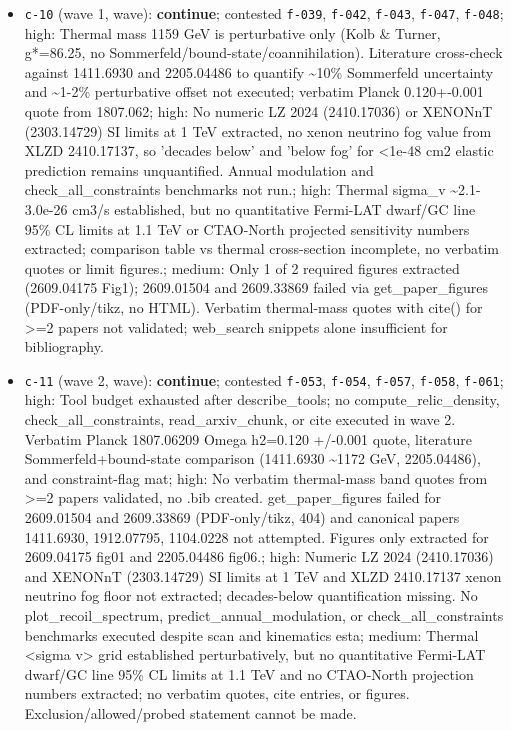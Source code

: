 \documentclass[11pt,a4paper]{article}
\begin{document}
\begin{itemize}
  \item \texttt{c-10} (wave 1, wave): \textbf{continue}; contested \texttt{f-039}, \texttt{f-042}, \texttt{f-043}, \texttt{f-047}, \texttt{f-048}; high: Thermal mass 1159 GeV is perturbative only (Kolb \& Turner, g*=86.25, no Sommerfeld/bound-state/coannihilation). Literature cross-check against 1411.6930 and 2205.04486 to quantify \textasciitilde{}10\% Sommerfeld uncertainty and \textasciitilde{}1-2\% perturbative offset not executed; verbatim Planck 0.120+-0.001 quote from 1807.062; high: No numeric LZ 2024 (2410.17036) or XENONnT (2303.14729) SI limits at 1 TeV extracted, no xenon neutrino fog value from XLZD 2410.17137, so 'decades below' and 'below fog' for \textless{}1e-48 cm2 elastic prediction remains unquantified. Annual modulation and check\_all\_constraints benchmarks not run.; high: Thermal sigma\_v \textasciitilde{}2.1-3.0e-26 cm3/s established, but no quantitative Fermi-LAT dwarf/GC line 95\% CL limits at 1.1 TeV or CTAO-North projected sensitivity numbers extracted; comparison table vs thermal cross-section incomplete, no verbatim quotes or limit figures.; medium: Only 1 of 2 required figures extracted (2609.04175 Fig1); 2609.01504 and 2609.33869 failed via get\_paper\_figures (PDF-only/tikz, no HTML). Verbatim thermal-mass quotes with cite() for \textgreater{}=2 papers not validated; web\_search snippets alone insufficient for bibliography.
  \item \texttt{c-11} (wave 2, wave): \textbf{continue}; contested \texttt{f-053}, \texttt{f-054}, \texttt{f-057}, \texttt{f-058}, \texttt{f-061}; high: Tool budget exhausted after describe\_tools; no compute\_relic\_density, check\_all\_constraints, read\_arxiv\_chunk, or cite executed in wave 2. Verbatim Planck 1807.06209 Omega h2=0.120 +/-0.001 quote, literature Sommerfeld+bound-state comparison (1411.6930 \textasciitilde{}1172 GeV, 2205.04486), and constraint-flag mat; high: No verbatim thermal-mass band quotes from \textgreater{}=2 papers validated, no .bib created. get\_paper\_figures failed for 2609.01504 and 2609.33869 (PDF-only/tikz, 404) and canonical papers 1411.6930, 1912.07795, 1104.0228 not attempted. Figures only extracted for 2609.04175 fig01 and 2205.04486 fig06.; high: Numeric LZ 2024 (2410.17036) and XENONnT (2303.14729) SI limits at 1 TeV and XLZD 2410.17137 xenon neutrino fog floor not extracted; decades-below quantification missing. No plot\_recoil\_spectrum, predict\_annual\_modulation, or check\_all\_constraints benchmarks executed despite scan and kinematics esta; medium: Thermal \textless{}sigma v\textgreater{} grid established perturbatively, but no quantitative Fermi-LAT dwarf/GC line 95\% CL limits at 1.1 TeV and no CTAO-North projection numbers extracted; no verbatim quotes, cite entries, or figures. Exclusion/allowed/probed statement cannot be made.

\end{itemize}
\end{document}
